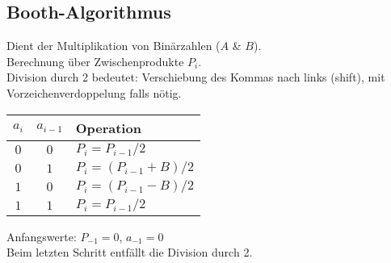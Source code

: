 \subsection{Booth-Algorithmus}
Dient der Multiplikation von Binärzahlen ($A$ \& $B$).\\
Berechnung über Zwischenprodukte $P_i$.\\
Division durch 2 bedeutet: Verschiebung des Kommas nach links (shift), mit Vorzeichenverdoppelung falls nötig.
\begin{center}
    \begin{tabular}{c c l}
        $a_i$ & $a_{i - 1}$ & Operation\\
        \hline
        $0$ & $0$ & $P_i = P_{i-1}/2$\\
        $0$ & $1$ & $P_i = (P_{i-1} + B)/2$\\
        $1$ & $0$ & $P_i = (P_{i-1} - B)/2$\\
        $1$ & $1$ & $P_i = P_{i-1}/2$\\
    \end{tabular}
\end{center}
Anfangswerte: $P_{-1} = 0$, $a_{-1} = 0$\\
Beim letzten Schritt entfällt die Division durch 2.